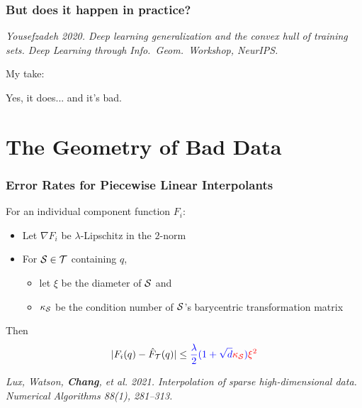 \documentclass[aspectratio=169]{beamer}
\begin{document}
\begin{frame}\frametitle{But does it happen in practice?}

\pause

{\small \it Yousefzadeh 2020. Deep learning generalization and the convex hull
of training sets.
Deep Learning through Info.~Geom.~Workshop, NeurIPS.
}

\pause
\bigskip

My take:

Yes, it does... and it's bad.

\end{frame}

\section{The Geometry of Bad Data}

\begin{frame}\frametitle{Error Rates for Piecewise Linear Interpolants}
For an individual component function $F_i$:
\begin{itemize}
\item Let $\nabla F_i$ be $\lambda$-Lipschitz in the $2$-norm\\
\item For ${\cal S}\in {\cal T}$ containing $q$,
\begin{itemize}
\item let $\xi$ be the diameter of ${\cal S}$ and
\item $\kappa_{\cal S}$ be the condition number of ${\cal S}$'s
barycentric transformation matrix
\end{itemize}
\end{itemize}
\bigskip
Then
$$
|F_i(q) - {\hat F}_{\cal T}(q)| \leq
{\color{blue} \frac{\lambda}{2}(1 + \sqrt{d}{\color{red}\kappa_{\cal S}})}
{\color{red} \xi^2}
$$

\bigskip

\vfill

{\small \it Lux, Watson, {\bf Chang}, et al. 2021. Interpolation of sparse high-dimensional data. Numerical Algorithms 88(1), 281--313.}

\end{frame}
\end{document}
